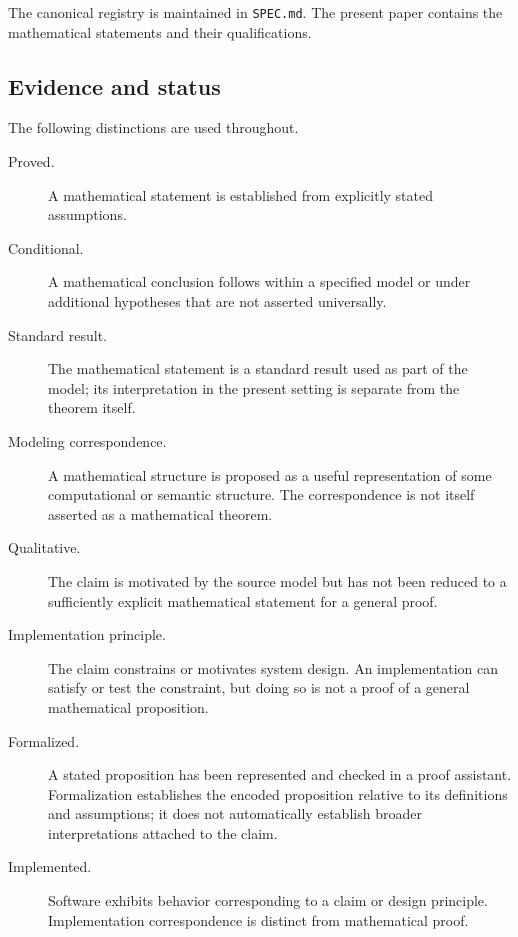 \documentclass[11pt]{article}
\theoremstyle{definition}
\theoremstyle{remark}
\begin{document}
The canonical registry is maintained in \texttt{SPEC.md}. The present paper
contains the mathematical statements and their qualifications.

\subsection{Evidence and status}

The following distinctions are used throughout.

\begin{description}
  \item[Proved.]
  A mathematical statement is established from explicitly stated assumptions.

  \item[Conditional.]
  A mathematical conclusion follows within a specified model or under
  additional hypotheses that are not asserted universally.

  \item[Standard result.]
  The mathematical statement is a standard result used as part of the model;
  its interpretation in the present setting is separate from the theorem
  itself.

  \item[Modeling correspondence.]
  A mathematical structure is proposed as a useful representation of some
  computational or semantic structure. The correspondence is not itself
  asserted as a mathematical theorem.

  \item[Qualitative.]
  The claim is motivated by the source model but has not been reduced to a
  sufficiently explicit mathematical statement for a general proof.

  \item[Implementation principle.]
  The claim constrains or motivates system design. An implementation can
  satisfy or test the constraint, but doing so is not a proof of a general
  mathematical proposition.

  \item[Formalized.]
  A stated proposition has been represented and checked in a proof assistant.
  Formalization establishes the encoded proposition relative to its
  definitions and assumptions; it does not automatically establish broader
  interpretations attached to the claim.

  \item[Implemented.]
  Software exhibits behavior corresponding to a claim or design principle.
  Implementation correspondence is distinct from mathematical proof.
\end{description}
\end{document}
